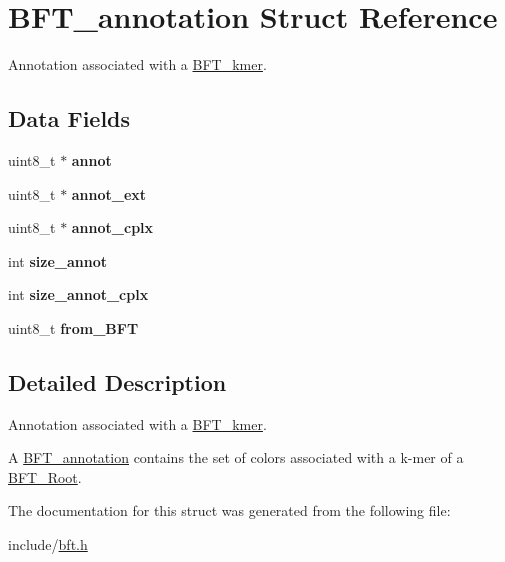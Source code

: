 \hypertarget{structBFT__annotation}{}\section{B\+F\+T\+\_\+annotation Struct Reference}
\label{structBFT__annotation}


Annotation associated with a \hyperlink{structBFT__kmer}{B\+F\+T\+\_\+kmer}.  


\subsection*{Data Fields}
\begin{DoxyCompactItemize}
\item 
uint8\+\_\+t $\ast$ {\bfseries annot}\hypertarget{structBFT__annotation_aa286433f7ad06a2e40862186dc93cba4}{}\label{structBFT__annotation_aa286433f7ad06a2e40862186dc93cba4}

\item 
uint8\+\_\+t $\ast$ {\bfseries annot\+\_\+ext}\hypertarget{structBFT__annotation_affce4cc9bed923fbc5bb884eb4a6798a}{}\label{structBFT__annotation_affce4cc9bed923fbc5bb884eb4a6798a}

\item 
uint8\+\_\+t $\ast$ {\bfseries annot\+\_\+cplx}\hypertarget{structBFT__annotation_aa0175d255a5d43991a7a1bd9ca9d3b9f}{}\label{structBFT__annotation_aa0175d255a5d43991a7a1bd9ca9d3b9f}

\item 
int {\bfseries size\+\_\+annot}\hypertarget{structBFT__annotation_a811c32fbbd0cecb9fdcc4588016bf170}{}\label{structBFT__annotation_a811c32fbbd0cecb9fdcc4588016bf170}

\item 
int {\bfseries size\+\_\+annot\+\_\+cplx}\hypertarget{structBFT__annotation_ab241457b872fc5d1f082edfc532eccb0}{}\label{structBFT__annotation_ab241457b872fc5d1f082edfc532eccb0}

\item 
uint8\+\_\+t {\bfseries from\+\_\+\+B\+FT}\hypertarget{structBFT__annotation_ae5b18246fa3dea4abda1f679e46fc03c}{}\label{structBFT__annotation_ae5b18246fa3dea4abda1f679e46fc03c}

\end{DoxyCompactItemize}


\subsection{Detailed Description}
Annotation associated with a \hyperlink{structBFT__kmer}{B\+F\+T\+\_\+kmer}. 

A \hyperlink{structBFT__annotation}{B\+F\+T\+\_\+annotation} contains the set of colors associated with a k-\/mer of a \hyperlink{structBFT__Root}{B\+F\+T\+\_\+\+Root}. 

The documentation for this struct was generated from the following file\+:\begin{DoxyCompactItemize}
\item 
include/\hyperlink{bft_8h}{bft.\+h}\end{DoxyCompactItemize}
